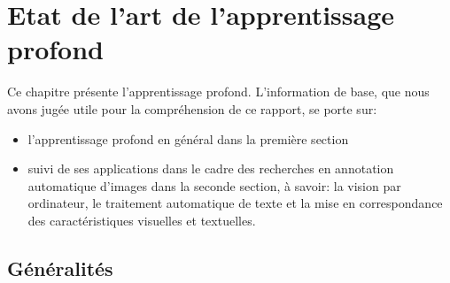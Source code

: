 \pagestyle{fancy}

\renewcommand{\footrulewidth}{1pt}

\fancyhead[C]{\thepage}

\fancyfoot[C]{\thepage}


\chapter{Etat de l'art de l'apprentissage profond} \label{genetap}
Ce chapitre présente l'apprentissage profond. L'information de base, que nous avons jugée utile pour la compréhension de ce rapport, se porte sur:
\begin{itemize}
\item l'apprentissage profond en général dans la première section
\item suivi de ses applications dans le cadre des recherches en annotation automatique d'images dans la seconde section, à savoir: la vision par ordinateur, le traitement automatique de texte et la mise en correspondance des caractéristiques visuelles et textuelles.
\end{itemize}

\smallskip

\section{Généralités} \label{generalite}

